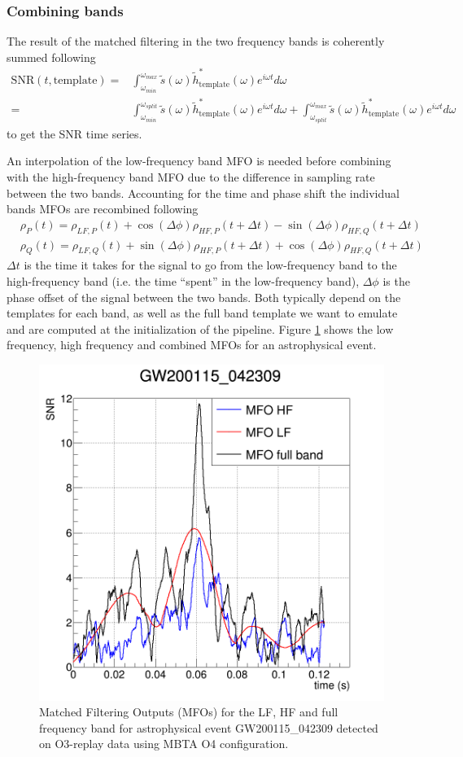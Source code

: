 \subsubsection{Combining bands}

The result of the matched filtering in the two frequency bands is coherently summed following
%
\begin{align}
  \textrm{SNR}(t,\textrm{template}) =& \int_{\omega_{min}}^{\omega_{max}} \tilde{s}(\omega)\tilde{h}_{\textrm{template}}^*(\omega) e^{i\omega t} d\omega\\
  =& \int_{\omega_{min}}^{\omega_{split}} \tilde{s}(\omega)\tilde{h}_{\textrm{template}}^*(\omega) e^{i\omega t} d\omega + \int_{\omega_{split}}^{\omega_{max}} \tilde{s}(\omega)\tilde{h}_{\textrm{template}}^*(\omega) e^{i\omega t} d\omega
\end{align}
%
to get the SNR time series.

An interpolation of the low-frequency band MFO is needed before combining with the high-frequency band MFO due to the difference in sampling rate between the two bands.
Accounting for the time and phase shift the individual bands MFOs are recombined following
%
\begin{align}
  &\rho_P(t) = \rho_{LF,P}(t) + \cos(\Delta\phi)\rho_{HF,P}(t+\Delta t) - \sin(\Delta\phi)\rho_{HF,Q}(t+\Delta t)\\
  &\rho_Q(t) = \rho_{LF,Q}(t) + \sin(\Delta\phi)\rho_{HF,P}(t+\Delta t) + \cos(\Delta\phi)\rho_{HF,Q}(t+\Delta t)
    \label{eq:mfo_combi}
\end{align}
%
$\Delta t$ is the time it takes for the signal to go from the low-frequency band to the high-frequency band (i.e. the time ``spent'' in the low-frequency band), $\Delta\phi$ is the phase offset of the signal between the two bands.
Both typically depend on the templates for each band, as well as the full band template we want to emulate and are computed at the initialization of the pipeline.
Figure \ref{fig:mfo_combi} shows the low frequency, high frequency and combined MFOs for an astrophysical event.\\

\begin{figure}
  \centering
  \includegraphics[width=0.6\linewidth]{sectionMBTA/cMFOcombi.png}
  \caption{Matched Filtering Outputs (MFOs) for the LF, HF and full frequency band for astrophysical event GW200115\_042309 detected on O3-replay data using MBTA O4 configuration.}
  \label{fig:mfo_combi}
\end{figure}

